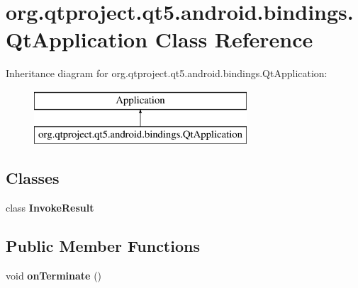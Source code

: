 \hypertarget{classorg_1_1qtproject_1_1qt5_1_1android_1_1bindings_1_1_qt_application}{}\section{org.\+qtproject.\+qt5.\+android.\+bindings.\+Qt\+Application Class Reference}
\label{classorg_1_1qtproject_1_1qt5_1_1android_1_1bindings_1_1_qt_application}
Inheritance diagram for org.\+qtproject.\+qt5.\+android.\+bindings.\+Qt\+Application\+:\begin{figure}[H]
\begin{center}
\leavevmode
\includegraphics[height=2.000000cm]{classorg_1_1qtproject_1_1qt5_1_1android_1_1bindings_1_1_qt_application}
\end{center}
\end{figure}
\subsection*{Classes}
\begin{DoxyCompactItemize}
\item 
class {\bfseries Invoke\+Result}
\end{DoxyCompactItemize}
\subsection*{Public Member Functions}
\begin{DoxyCompactItemize}
\item 
\mbox{\label{classorg_1_1qtproject_1_1qt5_1_1android_1_1bindings_1_1_qt_application_a643840ad1a423ebcae10f20c6dcf98d0}} 
void {\bfseries on\+Terminate} ()
\end{DoxyCompactItemize}
